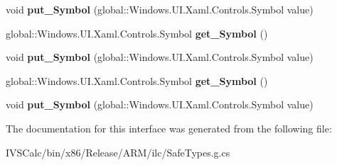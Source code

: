 \begin{DoxyCompactItemize}
\item 
\mbox{\label{interface_windows_1_1_u_i_1_1_xaml_1_1_controls_1_1_i_symbol_icon_a78b393db4bddcf871347b15102286258}} 
void {\bfseries put\+\_\+\+Symbol} (global\+::\+Windows.\+U\+I.\+Xaml.\+Controls.\+Symbol value)
\item 
\mbox{\label{interface_windows_1_1_u_i_1_1_xaml_1_1_controls_1_1_i_symbol_icon_abbf84381cc7314ad3aa1dc6220fe96e7}} 
global\+::\+Windows.\+U\+I.\+Xaml.\+Controls.\+Symbol {\bfseries get\+\_\+\+Symbol} ()
\item 
\mbox{\label{interface_windows_1_1_u_i_1_1_xaml_1_1_controls_1_1_i_symbol_icon_a78b393db4bddcf871347b15102286258}} 
void {\bfseries put\+\_\+\+Symbol} (global\+::\+Windows.\+U\+I.\+Xaml.\+Controls.\+Symbol value)
\item 
\mbox{\label{interface_windows_1_1_u_i_1_1_xaml_1_1_controls_1_1_i_symbol_icon_abbf84381cc7314ad3aa1dc6220fe96e7}} 
global\+::\+Windows.\+U\+I.\+Xaml.\+Controls.\+Symbol {\bfseries get\+\_\+\+Symbol} ()
\item 
\mbox{\label{interface_windows_1_1_u_i_1_1_xaml_1_1_controls_1_1_i_symbol_icon_a78b393db4bddcf871347b15102286258}} 
void {\bfseries put\+\_\+\+Symbol} (global\+::\+Windows.\+U\+I.\+Xaml.\+Controls.\+Symbol value)
\end{DoxyCompactItemize}


The documentation for this interface was generated from the following file\+:\begin{DoxyCompactItemize}
\item 
I\+V\+S\+Calc/bin/x86/\+Release/\+A\+R\+M/ilc/Safe\+Types.\+g.\+cs\end{DoxyCompactItemize}
